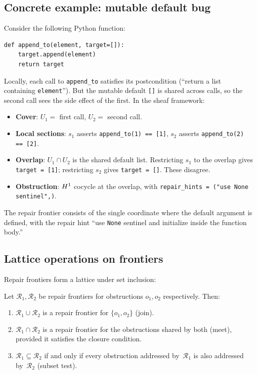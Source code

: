 \documentclass[11pt]{article}
\begin{document}
\subsection{Concrete example: mutable default bug}

Consider the following Python function:

\begin{lstlisting}[caption={Mutable default argument bug.}]
def append_to(element, target=[]):
    target.append(element)
    return target
\end{lstlisting}

\noindent
Locally, each call to \texttt{append\_to} satisfies its postcondition
(``return a list containing \texttt{element}'').  But the mutable default
\texttt{[]} is shared across calls, so the second call sees the side effect
of the first.  In the sheaf framework:

\begin{itemize}[leftmargin=*]
\item \textbf{Cover}: $U_1 = $ first call, $U_2 = $ second call.
\item \textbf{Local sections}: $s_1$ asserts \texttt{append\_to(1) == [1]},
  $s_2$ asserts \texttt{append\_to(2) == [2]}.
\item \textbf{Overlap}: $U_1 \cap U_2$ is the shared default list.
  Restricting $s_1$ to the overlap gives \texttt{target = [1]};
  restricting $s_2$ gives \texttt{target = []}.  These disagree.
\item \textbf{Obstruction}: $H^{1}$ cocycle at the overlap, with
  \texttt{repair\_hints = ("use None sentinel",)}.
\end{itemize}

The repair frontier consists of the single coordinate where the default
argument is defined, with the repair hint ``use \texttt{None} sentinel and
initialize inside the function body.''

\subsection{Lattice operations on frontiers}

Repair frontiers form a lattice under set inclusion:

\begin{proposition}\label{prop:frontier-lattice}
Let $\mathcal{R}_1, \mathcal{R}_2$ be repair frontiers for obstructions
$o_1, o_2$ respectively.  Then:
\begin{enumerate}[label=(\roman*)]
\item $\mathcal{R}_1 \cup \mathcal{R}_2$ is a repair frontier for
  $\{o_1, o_2\}$ (join).
\item $\mathcal{R}_1 \cap \mathcal{R}_2$ is a repair frontier for
  the obstructions shared by both (meet), provided it satisfies the
  closure condition.
\item $\mathcal{R}_1 \subseteq \mathcal{R}_2$ if and only if every
  obstruction addressed by~$\mathcal{R}_1$ is also addressed
  by~$\mathcal{R}_2$ (subset test).
\end{enumerate}
\end{proposition}
\end{document}
